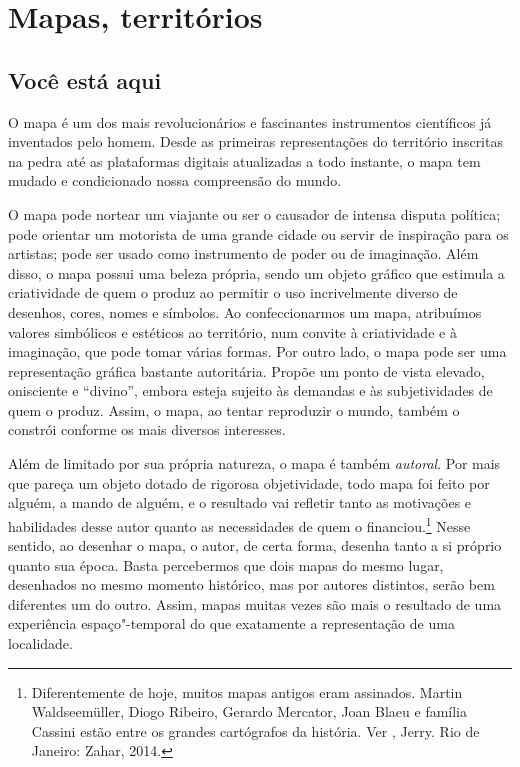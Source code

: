 \part{Mapas, territórios}

\chapter{Você está aqui}

O mapa é um dos mais revolucionários e fascinantes instrumentos
científicos já inventados pelo homem. Desde as primeiras representações
do território inscritas na pedra até as plataformas digitais atualizadas
a todo instante, o mapa tem mudado e condicionado nossa compreensão do
mundo.

O mapa pode nortear um viajante ou ser o causador de intensa disputa
política; pode orientar um motorista de uma grande cidade ou servir de
inspiração para os artistas; pode ser usado como instrumento de poder ou
de imaginação. Além disso, o mapa possui uma beleza própria, sendo um
objeto gráfico que estimula a criatividade de quem o produz ao permitir
o uso incrivelmente diverso de desenhos, cores, nomes e símbolos. Ao
confeccionarmos um mapa, atribuímos valores simbólicos e estéticos ao
território, num convite à criatividade e à imaginação, que pode tomar
várias formas. Por outro lado, o mapa pode ser uma representação gráfica
bastante autoritária. Propõe um ponto de vista elevado, onisciente e
``divino'', embora esteja sujeito às demandas e às subjetividades de
quem o produz. Assim, o mapa, ao tentar reproduzir o mundo, também o
constrói conforme os mais diversos interesses.

Além de limitado por sua própria natureza, o mapa é também
\emph{autoral}. Por mais que pareça um objeto dotado de rigorosa
objetividade, todo mapa foi feito por alguém, a mando de alguém, e o
resultado vai refletir tanto as motivações e habilidades desse autor
quanto as necessidades de quem o financiou.\footnote{Diferentemente de
  hoje, muitos mapas antigos eram assinados. Martin Waldseemüller, Diogo
  Ribeiro, Gerardo Mercator, Joan Blaeu e família Cassini estão entre os
  grandes cartógrafos da história. Ver , Jerry. {} Rio de Janeiro: Zahar, 2014.} Nesse
sentido, ao desenhar o mapa, o autor, de certa forma, desenha
tanto a si próprio quanto sua época. Basta percebermos que dois mapas do mesmo lugar,
desenhados no mesmo momento histórico, mas por autores distintos, serão
bem diferentes um do outro. Assim, mapas muitas vezes são mais o
resultado de uma experiência espaço"-temporal do que exatamente a
representação de uma localidade.

